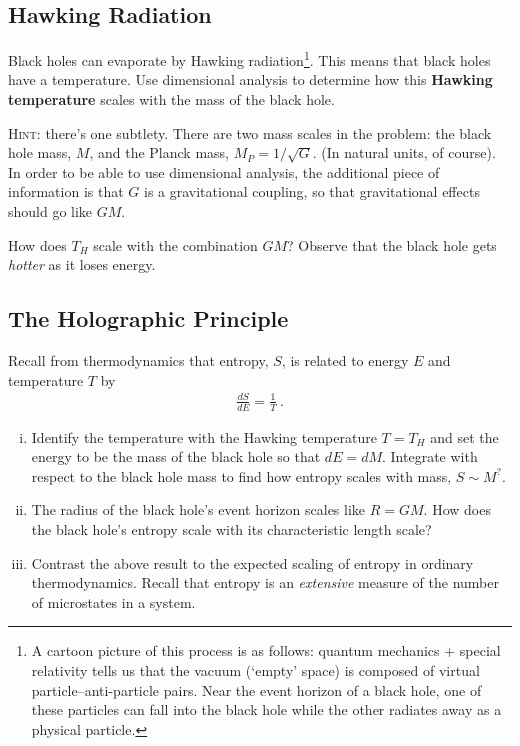 \documentclass[12pt]{article}
\numberwithin{equation}{section}    %
\begin{document}
\subsection{Hawking Radiation}

Black holes can evaporate by Hawking radiation\footnote{A cartoon picture of this process is as follows: quantum mechanics + special relativity tells us that the vacuum (`empty' space) is composed of virtual particle--anti-particle pairs. Near the event horizon of a black hole, one of these particles can fall into the black hole while the other radiates away as a physical particle.}. This means that black holes have a temperature. Use dimensional analysis to determine how this \textbf{Hawking temperature} scales with the mass of the black hole. 

\textsc{Hint}: there's one subtlety. There are two mass scales in the problem: the black hole mass, $M$, and the Planck mass, $M_P = 1/\sqrt{G}$. (In natural units, of course). In order to be able to use dimensional analysis, the additional piece of information is that $G$ is a gravitational coupling, so that gravitational effects should go like $GM$. 

How does $T_H$ scale with the combination $GM$? Observe that the black hole gets \emph{hotter} as it loses energy.

\subsection{The Holographic Principle}

Recall from thermodynamics that entropy, $S$, is related to energy $E$ and temperature $T$ by
\begin{align}
	\frac{dS}{dE} = \frac{1}{T} \ .
\end{align}
\begin{enumerate}[(i)]
	\item Identify the temperature with the Hawking temperature $T=T_H$ and set the energy to be the mass of the black hole so that $dE = dM$. Integrate with respect to the black hole mass to find how entropy scales with mass, $S \sim M^?$.
	\item The radius of the black hole's event horizon scales like $R = GM$. How does the black hole's entropy scale with its characteristic length scale? 
	\item Contrast the above result to the expected scaling of entropy in ordinary thermodynamics. Recall that entropy is an \emph{extensive} measure of the number of microstates in a system.
\end{enumerate}
\end{document}
